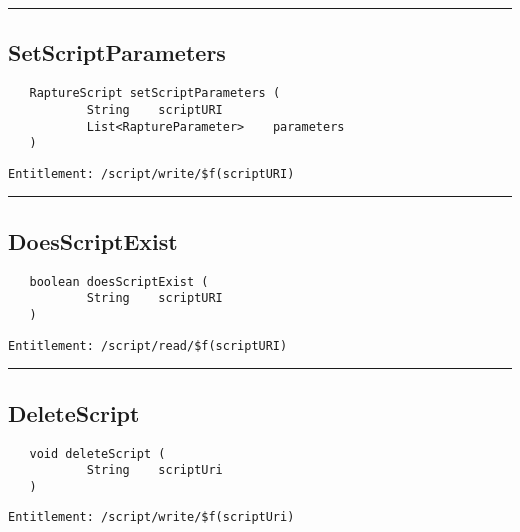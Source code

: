 \rule{12cm}{2pt}
\subsection{SetScriptParameters}
\label{Api:SetScriptParameters}
\begin{verbatim}
   RaptureScript setScriptParameters (
           String    scriptURI
           List<RaptureParameter>    parameters
   )
\end{verbatim}
\begin{Verbatim}[fontsize=\small, formatcom=\color{Maroon}]
  Entitlement: /script/write/$f(scriptURI)
\end{Verbatim}



\rule{12cm}{2pt}
\subsection{DoesScriptExist}
\label{Api:DoesScriptExist}
\begin{verbatim}
   boolean doesScriptExist (
           String    scriptURI
   )
\end{verbatim}
\begin{Verbatim}[fontsize=\small, formatcom=\color{Maroon}]
  Entitlement: /script/read/$f(scriptURI)
\end{Verbatim}



\rule{12cm}{2pt}
\subsection{DeleteScript}
\label{Api:DeleteScript}
\begin{verbatim}
   void deleteScript (
           String    scriptUri
   )
\end{verbatim}
\begin{Verbatim}[fontsize=\small, formatcom=\color{Maroon}]
  Entitlement: /script/write/$f(scriptUri)
\end{Verbatim}



